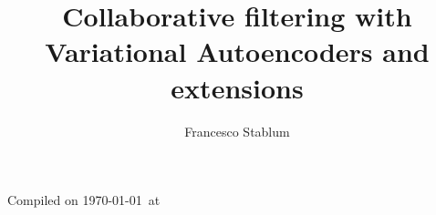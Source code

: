 \documentclass[12pt]{book}
\author{Francesco Stablum}
\title{Collaborative filtering with Variational Autoencoders and extensions}
\begin{document}
\maketitle
Compiled on \today\ at \currenttime
\tableofcontents











%
%

%
%
%
%
%
%
%
%
%
%
%
%
%
%
%
%
%
%
%
%


\end{document}
